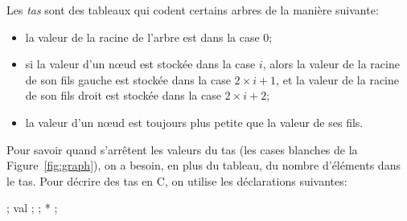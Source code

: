 Les \emph{tas} sont des tableaux qui codent certains arbres de la
mani{\`e}re suivante:
\begin{itemize}\setlength\itemsep {-3pt}
\item la valeur de la racine de l'arbre est dans la case $0$;
\item si la valeur d'un n\oe ud est stock{\'e}e dans la case $i$, alors
  la valeur de la racine de son fils gauche est stock{\'e}e dans la case
  $2\times i + 1$, et la valeur de la racine de son fils droit est
  stock{\'e}e dans la case $2\times i + 2$;
\item la valeur d'un n\oe ud est toujours plus petite que la valeur
  de ses fils.
\end{itemize}
Pour savoir quand s'arr{\^e}tent les valeurs du tas (les cases blanches de
la Figure~\ref{fig:graph}), on a besoin, en plus du tableau, du nombre
d'{\'e}l{\'e}ments dans le tas. Pour d{\'e}crire des tas en C, on utilise les
d{\'e}clarations suivantes:
\begin{Ccode}
  \ctab\cstruct {} \lb
  \ctab \cint {} ; 
  \ctab \cint * val ; 
  \ctab\rb ;
  \ctab\ctypedef \cstruct {} *  ;
\end{Ccode}


